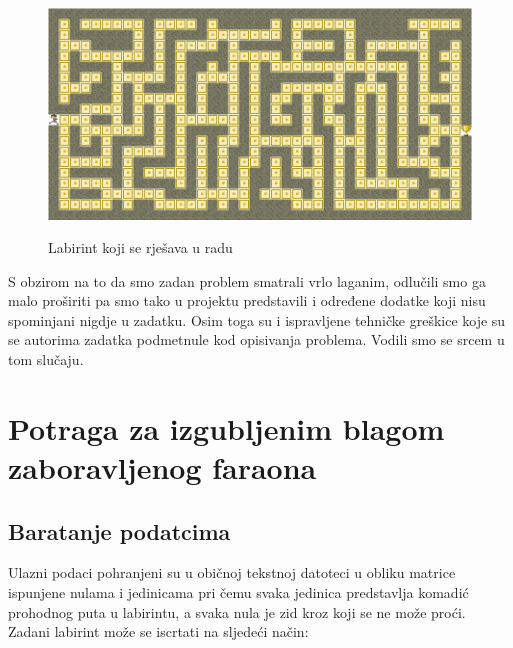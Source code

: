 \documentclass[11pt]{article}
\let\oldsection\section
\renewcommand\section{\clearpage\oldsection}
\begin{document}
	\begin{figure}[h]
		\centering
		\includegraphics[width=.9\linewidth]{"slikice/labirint.jpg"}
		\label{lab1}
		\caption{Labirint koji se rješava u radu}
	\end{figure}

	S obzirom na to da smo zadan problem smatrali vrlo laganim, odlučili
	smo ga malo proširiti pa smo tako u projektu predstavili i određene
	dodatke koji nisu spominjani nigdje u zadatku. Osim toga su i
	ispravljene tehničke greškice koje su se autorima zadatka podmetnule
	kod opisivanja problema. Vodili smo se srcem u tom slučaju.

    \hypertarget{potraga-za-izgubljenim-blagom-zaboravljenog-faraona}{%
\section{Potraga za izgubljenim blagom zaboravljenog
faraona}\label{potraga-za-izgubljenim-blagom-zaboravljenog-faraona}}

    \hypertarget{baratanje-podatcima}{
\subsection{Baratanje podatcima}\label{baratanje-podatcima}}

Ulazni podaci pohranjeni su u običnoj tekstnoj datoteci u obliku matrice ispunjene nulama i jedinicama pri čemu svaka jedinica predstavlja komadić prohodnog puta u labirintu, a svaka nula je zid kroz koji se ne može proći. Zadani labirint može se iscrtati na sljedeći način:
\end{document}
